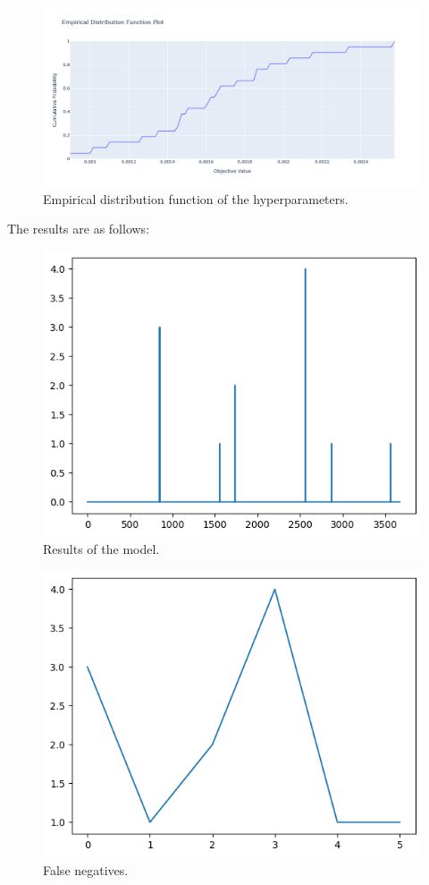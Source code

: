 \documentclass[AER]{AEA}
\begin{document}
\begin{figure}[ht!]
    \includegraphics[scale = 0.3]{empirical_distribution_function.png}
    \caption{Empirical distribution function of the hyperparameters.}
    \label{fig:edf}
\end{figure}
The results are as follows:
\begin{figure}[ht!]
    \includegraphics[scale = 0.3]{results.png}
    \caption{Results of the model.}
    \label{fig:results}
\end{figure}
\begin{figure}[ht!]
    \includegraphics[scale = 0.3]{false_neg.png}
    \caption{False negatives.}
    \label{fig:false_neg}
\end{figure}
\end{document}
